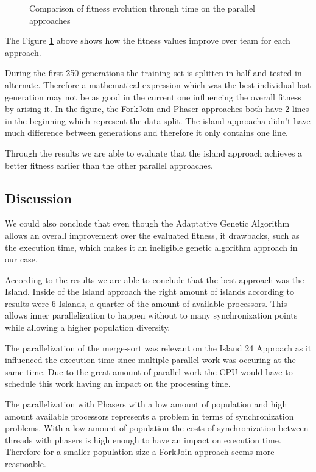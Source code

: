 \documentclass[runningheads]{llncs}
\begin{document}
\begin{figure}[H]
\centering
{}
\caption{Comparison of fitness evolution through time on the parallel approaches} \label{comparacaoLinhas}
\end{figure}

The Figure \ref{comparacaoLinhas} above shows how the fitness values improve over team for each approach.

During the first 250 generations the training set is splitten in half and tested in alternate. Therefore a mathematical expression which was the best individual last generation may not be as good in the current one influencing the overall fitness by arising it. In the figure, the ForkJoin and Phaser approaches both have 2 lines in the beginning which represent the data split. The island approacha didn't have much difference between generations and therefore it only contains one line.

Through the results we are able to evaluate that the island approach achieves a better fitness earlier than the other parallel approaches.

\subsection{Discussion}

We could also conclude that even though the Adaptative Genetic Algorithm allows an overall improvement over the evaluated fitness, it drawbacks, such as the execution time, which makes it an ineligible genetic algorithm approach in our case.

According to the results we are able to conclude that the best approach was the Island. Inside of the Island approach the right amount of islands according to results were 6 Islands, a quarter of the amount of available processors. This allows inner parallelization to happen without to many synchronization points while allowing a higher population diversity.

The parallelization of the merge-sort was relevant on the Island 24 Approach as it influenced the execution time since multiple parallel work was occuring at the same time. Due to the great amount of parallel work the CPU would have to schedule this work having an impact on the processing time.

The parallelization with Phasers with a low amount of population and high amount available processors represents a problem in terms of synchronization problems. With a low amount of population the costs of synchronization between threads with phasers is high enough to have an impact on execution time. Therefore for a smaller population size a ForkJoin approach seems more reasnoable.
\end{document}
